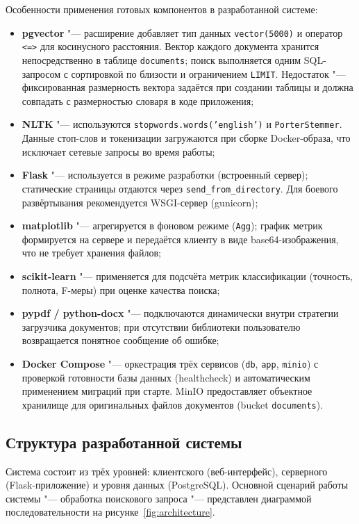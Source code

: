 Особенности применения готовых компонентов в разработанной системе:

\begin{itemize}
	\item \textbf{pgvector} "--- расширение добавляет тип данных \texttt{vector(5000)} и оператор \texttt{<=>} для косинусного расстояния. Вектор каждого документа хранится непосредственно в таблице \texttt{documents}; поиск выполняется одним SQL-запросом с сортировкой по близости и ограничением \texttt{LIMIT}. Недостаток "--- фиксированная размерность вектора задаётся при создании таблицы и должна совпадать с размерностью словаря в коде приложения;
	\item \textbf{NLTK} "--- используются \texttt{stopwords.words('english')} и \texttt{PorterStemmer}. Данные стоп-слов и токенизации загружаются при сборке Docker-образа, что исключает сетевые запросы во время работы;
	\item \textbf{Flask} "--- используется в режиме разработки (встроенный сервер); статические страницы отдаются через \texttt{send\_from\_directory}. Для боевого развёртывания рекомендуется WSGI-сервер (gunicorn);
	\item \textbf{matplotlib} "--- агрегируется в фоновом режиме (\texttt{Agg}); график метрик формируется на сервере и передаётся клиенту в виде base64-изображения, что не требует хранения файлов;
	\item \textbf{scikit-learn} "--- применяется для подсчёта метрик классификации (точность, полнота, F-меры) при оценке качества поиска;
	\item \textbf{pypdf / python-docx} "--- подключаются динамически внутри стратегии загрузчика документов; при отсутствии библиотеки пользователю возвращается понятное сообщение об ошибке;
	\item \textbf{Docker Compose} "--- оркестрация трёх сервисов (\texttt{db}, \texttt{app}, \texttt{minio}) с проверкой готовности базы данных (healthcheck) и автоматическим применением миграций при старте. MinIO предоставляет объектное хранилище для оригинальных файлов документов (bucket \texttt{documents}).
\end{itemize}

\subsection{Структура разработанной системы}

Система состоит из трёх уровней: клиентского (веб-интерфейс), серверного (Flask-приложение)
и уровня данных (PostgreSQL). Основной сценарий работы системы "--- обработка поискового
запроса "--- представлен диаграммой последовательности на рисунке~\ref{fig:architecture}.

